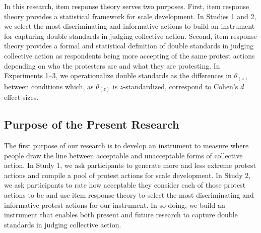 \documentclass[12pt, letterpaper]{article}
\begin{document}
In this research, item response theory serves two purposes. First, item
response theory provides a statistical framework for scale development.
In Studies 1 and 2, we select the most discriminating and informative
actions to build an instrument for capturing double standards in judging
collective action. Second, item response theory provides a formal and
statistical definition of double standards in judging collective action
as respondents being more accepting of the same protest actions
depending on who the protesters are and what they are protesting. In
Experiments 1--3, we operationalize double standards as the differences
in \(\theta_{(z)}\) between conditions which, as \(\theta_{(z)}\) is
\(z\)-standardized, correspond to Cohen's \(d\) effect sizes.

\hypertarget{purpose-of-the-present-research}{%
\subsection{Purpose of the Present
Research}\label{purpose-of-the-present-research}}

The first purpose of our research is to develop an instrument to measure
where people draw the line between acceptable and unacceptable forms of
collective action. In Study 1, we ask participants to generate more and
less extreme protest actions and compile a pool of protest actions for
scale development. In Study 2, we ask participants to rate how
acceptable they consider each of those protest actions to be and use
item response theory to select the most discriminating and informative
protest actions for our instrument. In so doing, we build an instrument
that enables both present and future research to capture double
standards in judging collective action.
\end{document}
